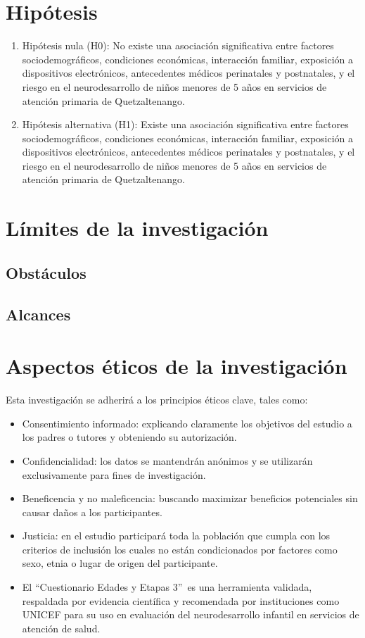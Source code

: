 \documentclass[11pt,letterpaper]{report}
\newcommand{\asq}{“Cuestionario Edades y Etapas 3”}
\begin{document}
\section{Hipótesis}
	\begin{enumerate}
		\item Hipótesis nula (H0): No existe una asociación significativa entre
		factores sociodemográficos, condiciones económicas, interacción
		familiar, exposición a dispositivos electrónicos, antecedentes médicos
		perinatales y postnatales, y el riesgo en el neurodesarrollo de niños
		menores de 5 años en servicios de atención primaria de Quetzaltenango.
		\item Hipótesis alternativa (H1): Existe una asociación significativa
		entre factores sociodemográficos, condiciones económicas, interacción
		familiar, exposición a dispositivos electrónicos, antecedentes médicos
		perinatales y postnatales, y el riesgo en el neurodesarrollo de niños
		menores de 5 años en servicios de atención primaria de Quetzaltenango.
	\end{enumerate}

\section{Límites de la investigación}
\subsection{Obstáculos}

\subsection{Alcances}

\section{Aspectos éticos de la investigación}
Esta investigación se adherirá a los principios éticos clave, tales como:
\begin{itemize}
	\item Consentimiento informado: explicando claramente los objetivos del
	estudio a los padres o tutores y obteniendo su autorización.

	\item Confidencialidad: los datos se mantendrán anónimos y se utilizarán 
	exclusivamente para fines de investigación.

	\item Beneficencia y no maleficencia: buscando maximizar beneficios
	potenciales sin causar daños a los participantes.

	\item Justicia: en el estudio participará toda la población que cumpla
	con los criterios de inclusión los cuales no están condicionados por
	factores como sexo, etnia o lugar de origen del participante.

	\item El \asq\ es una herramienta validada, respaldada por evidencia
	científica y recomendada por instituciones como UNICEF para su uso en
	evaluación del neurodesarrollo infantil en servicios de atención de
	salud. \cite{UNICEFrespaldo}
\end{itemize}
\end{document}
